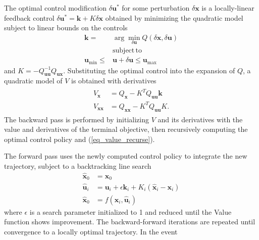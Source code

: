 \documentclass[journal ]{new-aiaa}
\newcommand{\state}{\ensuremath{\mathbf{x}}}
\newcommand{\control}{\ensuremath{\mathbf{u}}}
\begin{document}
The optimal control modification $\delta\control^*$ for some perturbation $\delta\state$ is a locally-linear feedback control $\delta\control^* = \mathbf{k} + K\delta\state$ obtained by minimizing the quadratic model subject to linear bounds on the controls
\begin{align}
\mathbf{k} = &\arg\min_{\delta\control} Q(\delta\state,\delta\control) \\
&\mathrm{subject\,to\,\;} \nonumber\\
\control_{\min}\le &\control+\delta\control \le\control_{\max}
\end{align}
and $K = -Q_{\control\control}^{-1}Q_{\control\state}$. Substituting the optimal control into the expansion of $Q$, a quadratic model of $V$ is obtained with derivatives
\begin{align}
\begin{split}
\label{eq_value_recurse}
V_\state &= Q_{\state}- K^TQ_{\control\control}\mathbf{k}\\
V_{\state\state} &= Q_{\state\state} - K^TQ_{\control\control}K.
\end{split}
\end{align}
The backward pass is performed by initializing $V$ and its derivatives with the value and derivatives of the terminal objective, then recursively computing the optimal control policy and (\ref{eq_value_recurse}).

The forward pass uses the newly computed control policy to integrate the new trajectory, subject to a backtracking line search
\begin{align}
\hat{\state}_0 &= \state_0 \\
\hat{\control}_{i} &= \control_i + \epsilon \mathbf{k}_i + K_i(\hat{\state}_i - \state_i)\\
\hat{\state}_0 &= f(\hat{\state}_i,\hat{\control}_i)
\end{align}
where $\epsilon$ is a search parameter initialized to 1 and reduced until the Value function shows improvement. The backward-forward iterations are repeated until convergence to a locally optimal trajectory. In the event 
\end{document}
